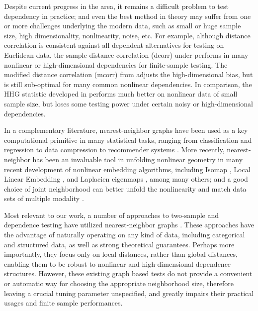\documentclass[11pt]{article}
\begin{document}
Despite current progress in the area, it remains a difficult problem to test dependency in practice; and even the best method in theory may suffer from one or more challenges underlying the modern data, such as small or huge sample size, high dimensionality, nonlinearity, noise, etc. For example, although distance correlation is consistent against all dependent alternatives for testing on Euclidean data, the sample distance correlation (dcorr) under-performs in many nonlinear or high-dimensional dependencies for finite-sample testing. The modified distance correlation (mcorr) from \cite{SzekelyRizzo2013a} adjusts the high-dimensional bias, but is still sub-optimal for many common nonlinear dependencies. In comparison, the HHG statistic developed in \cite{HellerGorfine2013} performs much better on nonlinear data of small sample size, but loses some testing power under certain noisy or high-dimensional dependencies. %

In a complementary literature, nearest-neighbor graphs have been used as a key computational primitive in many statistical tasks, ranging from classification and regression \cite{Stone1977} to data compression to recommender systems \cite{Sarwar2000}. 
More recently, nearest-neighbor has been an invaluable tool in unfolding nonlinear geometry in many recent development of nonlinear embedding algorithms, including Isomap \cite{TenenbaumSilvaLangford2000, SilvaTenenbaum2003}, Local Linear Embedding \cite{SaulRoweis2000, RoweisSaul2003}, and Laplacien eigenmaps \cite{BelkinNiyogi2003}, among many others; and a good choice of joint neighborhood can better unfold the nonlinearity and match data sets of multiple modality \cite{ShenVogelsteinPriebe2016}.

Most relevant to our work, a number of approaches to two-sample and dependence testing have utilized nearest-neighbor graphs \cite{David1966,Friedman1983,Schilling1986,Dumcke2014}.  These approaches have the advantage of naturally operating on any kind of data, including categorical and structured data, as well as strong theoretical guarantees.  Perhaps more importantly, they focus only on local distances, rather than global distances, enabling them to be robust to nonlinear and high-dimensional dependence structures.  However, these existing graph based tests do not provide a convenient or automatic way for choosing the appropriate neighborhood size, therefore leaving a crucial tuning parameter unspecified, and greatly impairs their practical usages and finite sample performances. 
\end{document}
